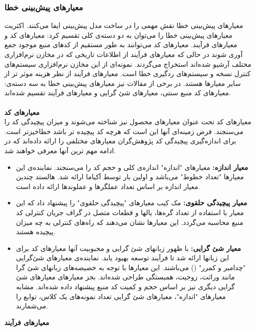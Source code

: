 \subsubsection{معیارهای پیش‌بینی خطا}

معیارهای پیش‌بینی خطا نقش مهمی را در ساخت مدل پیش‌بینی ایفا می‌کنند. اکثریت معیارهای پیش‌بینی خطا را می‌توان به دو دسته‌ی  کلی تقسیم کرد: معیارهای کد و معیارهای فرآیند. معیارهای کد می‌توانند به طور مستقیم از کدهای منبع موجود جمع آوری شوند در حالی که معیارهای فرآیند  از اطلاعات تاریخی که در مخازن نرم‌افزاری مختلف آرشیو شده‌اند استخراج می‌گردند. نمونه‌ای از این مخازن نرم‌افزاری سیستم‌های کنترل نسخه و سیستم‌های ردگیری خطا است. معیار‌های فرآیند از نظر هزینه موثر تر از سایر معیارها هستند\cite{arisholm2010systematic}. در برخی از مقالات نیز معیارهای  پیش‌بینی خطا به سه دسته‌ی: معیارهای کد منبع سنتی، معیارهای شئ گرایی و معیارهای فرآیند تقسیم شده‌اند\cite{radjenovic2013software}.\\\\
\textbf{معیارهای کد} \\

معیارهای کد تحت عنوان معیارهای محصول
نیز شناخته می‌شوند و میزان پیچیدگی کد را می‌سنجند. فرض زمینه‌ای آنها این است که هرچه کد پیچیده تر باشد خطا‌خیز‌تر است. برای اندازه‌گیری پیچیدگی کد پژوهش‌گران معیار‌های مختلفی را ارائه داده‌اند که در ادامه   مهم ترین آنها معرفی خواهند شد. 
\begin{itemize}
	\item \textbf{معیار اندازه: }
معیارهای "اندازه" اندازه‌ی کلی و حجم کد را می‌سنجند. نماینده‌ی این معیارها "تعداد خطوط" می‌باشد و اولین بار توسط آکیاما 
 \cite{akiyama1971example}  
 ارائه شد. هالستد  
 \cite{halstead1977elements} چندین معیار اندازه بر اساس  تعداد عملگرها و عملوند‌ها ارائه داده است. 
\item \textbf{معیار پیچیدگی حلقوی: }
مک کیب معیارهای "پیچیدگی حلقوی"
را پیشنهاد داد که این معیار با استفاده از تعداد گره‌ها، یالها و قطعات متصل در گراف جریان کنترلی  کد منبع محاسبه می‌گردد\cite{mccabe1976complexity}. این معیارها نشان می‌دهند که راه‌های کنترلی به چه میزان پیچیده هستند. 
\item \textbf{معیار شئ‌ گرایی: }
با ظهور زبانهای شئ گرایی و محبوبیت آنها معیارهای کد  برای این زبانها ارائه شد تا فرآیند توسعه بهبود یابد. نماینده‌ی معیارهای شئ‌گرایی "چدامبر و کمرر" 
() می‌باشند\cite{chidamber1994metrics}. این معیارها با توجه به خصیصه‌های زبانهای شئ گرا مانند وراثت، زوجیت، همبستگی طراحی شده‌اند. بجز معیارهای  معیارهای شئ گرایی دیگری نیز بر اساس حجم و کمیت کد منبع پیشنهاد داده شده‌اند. مشابه معیارهای "اندازه"، معیارهای شئ گرایی تعداد نمونه‌های یک کلاس، توابع را می‌شمارند. \\
\end{itemize}
\textbf{معیارهای فرآیند} \\

